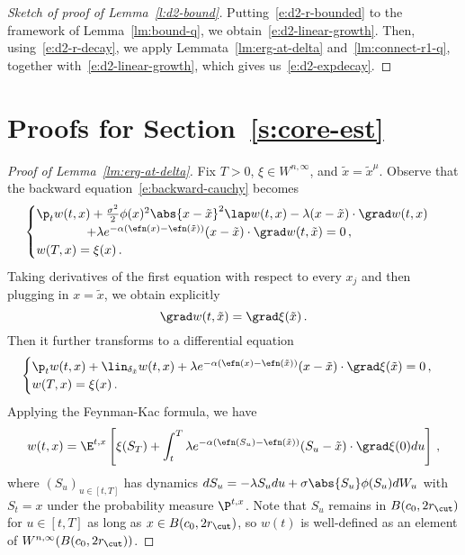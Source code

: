 \documentclass{amsart}
\begin{document}
\begin{proof}[Sketch of proof of Lemma~\ref{l:d2-bound}]
	Putting~\eqref{e:d2-r-bounded} to the framework of Lemma~\ref{lm:bound-q}, we obtain~\eqref{e:d2-linear-growth}.
	Then, using~\ref{e:d2-r-decay}, we apply Lemmata~\eqref{lm:erg-at-delta} and~\ref{lm:connect-r1-q}, together with~\eqref{e:d2-linear-growth}, which gives us~\eqref{e:d2-expdecay}.
\end{proof}


\section{Proofs for Section~\ref{s:core-est}}
\label{s:proof-core}

\begin{proof}[Proof of Lemma~\ref{lm:erg-at-delta}]
	\step[Expression of $w$]
	Fix $T > 0$, $\xi \in W^{n,\infty}$, and $\tilde x = \tilde x^\mu$.
	Observe that the backward equation~\eqref{e:backward-cauchy} becomes 
	\begin{equation*}
		\begin{cases}
			\p_t w(t,x) + \frac{\sigma^2}{2} \phi(x)^2 \abs{x - \tilde x}^2 \lap w(t,x) - \lambda (x - \tilde x) \cdot \grad w(t,x) \\
            \qquad \qquad + \lambda e^{-\alpha (\efn(x) - \efn(\tilde x))} (x - \tilde x) \cdot \grad w(t,\tilde x) = 0 \,, \\
			w(T,x) = \xi(x) \,.
		\end{cases}
	\end{equation*}
	Taking derivatives of the first equation with respect to every $x_j$ and then plugging in $x = \tilde x$, we obtain explicitly
	\begin{equation*}
		\grad w(t,\tilde x) =  \grad \xi(\tilde x) \,.
	\end{equation*}
	Then it further transforms to a differential equation 
	\begin{equation*}
		\begin{cases}
			\p_t w(t,x) + \lin_{\delta_{\tilde x}} w(t,x) + \lambda e^{-\alpha (\efn(x) - \efn(\tilde x))} (x - \tilde x) \cdot \grad \xi(\tilde x)  = 0 \,, \\
			w(T,x) = \xi(x) \,.
		\end{cases}
	\end{equation*}
	Applying the Feynman-Kac formula, we have 
	\begin{equation*}
		w(t,x) = \E^{t,x} \left[ \xi(S_T) + \int_t^T \lambda e^{-\alpha (\efn(S_u) - \efn(\tilde x))} (S_u - \tilde x) \cdot \grad \xi(0) du \right] \,,
	\end{equation*}
	where $(S_u)_{u \in [t,T]}$ has dynamics $dS_u = -\lambda S_u du + \sigma \abs{S_u} \phi(S_u) dW_u$ with $S_t = x$ under the probability measure $\P^{t,x}$.
    Note that $S_u$ remains in $B(c_0, 2r_\cut)$ for $u \in [t,T]$ as long as $x \in B(c_0, 2r_\cut)$, so $w(t)$ is well-defined as an element of $W^{n,\infty}(B(c_0, 2r_\cut))$.


\end{proof}
\end{document}
